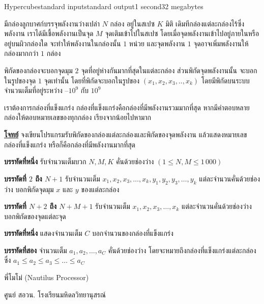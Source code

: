 \documentclass[11pt,a4paper]{article}
\begin{document}
\begin{problem}{Hypercube}{standard input}{standard output}{1 second}{32 megabytes}

          มีกล่องลูกบาศก์บรรจุพลังงานว่างเปล่า $N$ กล่อง อยู่ในสเปซ $K$ มิติ เดิมทีกล่องแต่ละกล่องไร้ซึ่งพลังงาน เราได้มีเชื้อพลังงานเป็นจุด $M$ จุดเติมเข้าไปในสเปซ โดยเมื่อจุดพลังงานเข้าไปอยู่ภายในหรืออยู่บนผิวกล่องใด จะทำให้พลังงานในกล่องนั้น $1$ หน่วย และจุดพลังงาน $1$ จุดอาจเพิ่มพลังงานให้กล่องมากกว่า $1$ กล่อง

          พิกัดของกล่องจะบอกจุดมุม $2$ จุดที่อยู่ห่างกันมากที่สุดในแต่ละกล่อง ส่วนพิกัดจุดพลังงานนั้น จะบอกในรูปของจุด $1$ จุดเท่านั้น โดยที่พิกัดจะบอกในรูปของ $(x_1,x_2,x_3,..,x_k)$ โดยมีพิกัดบนระบบจำนวนเต็มที่อยู่ระหว่าง $–10^9$ กับ $10^9$

          เราต้องการกล่องที่แข็งแกร่ง กล่องที่แข็งแกร่งคือกล่องที่มีพลังงานรวมมากที่สุด หากมีคำตอบหลายกล่องให้ตอบหมายเลขของทุกกล่อง เรียงจากน้อยไปหามาก

\bigskip
\underline{\textbf{โจทย์}}  จงเขียนโปรแกรมรับพิกัดของกล่องแต่ละกล่องและพิกัดของจุดพลังงาน แล้วแสดงหมายเลขกล่องที่แข็งแกร่ง หรือก็คือกล่องที่มีพลังงานมากที่สุด


\InputFile

\textbf{บรรทัดที่หนึ่ง} รับจำนวนเต็มบวก $N, M, K$ คั่นด้วยช่องว่าง $( 1 \leq N, M \leq 1\,000 )$

\textbf{บรรทัดที่ $2$ ถึง $N+1$} รับจำนวนเต็ม $x_1,x_2,x_3,…,x_k,y_1,y_2,y_3,…,y_k$ แต่ละจำนวนคั่นด้วยช่องว่าง บอกพิกัดจุดมุม $x$ และ $y$ ของแต่ละกล่อง

\textbf{บรรทัดที่ $N+2$ ถึง $N+M+1$} รับจำนวนเต็ม $x_1,x_2,x_3,…,x_k$ แต่ละจำนวนคั่นด้วยช่องว่าง บอกพิกัดของจุดแต่ละจุด


\OutputFile

\textbf{บรรทัดที่หนึ่ง} แสดงจำนวนเต็ม $C$ บอกจำนวนของกล่องที่แข็งแกร่ง

\textbf{บรรทัดที่สอง} จำนวนเต็ม $a_1,a_2,…,a_C$ คั่นด้วยช่องว่าง โดยจะหมายถึงกล่องที่แข็งแกร่งแต่ละกล่อง ซึ่ง $a_1 \leq a_2 \leq a_3 \leq … \leq a_C$


\Examples

\begin{example}
%
\end{example}


\Source

พี่โมโม่ (Nautilus Processor)

ศูนย์ สอวน. โรงเรียนมหิดลวิทยานุสรณ์

\end{problem}
\end{document}
